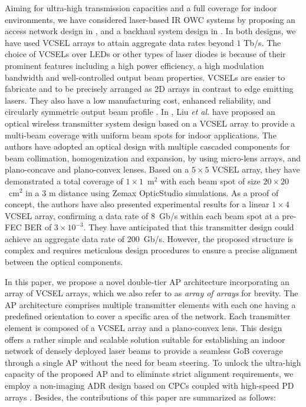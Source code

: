 \documentclass[lettersize,journal]{IEEEtran}
\begin{document}
Aiming for ultra-high transmission capacities and a full coverage for indoor environments, we have considered laser-based \ac{IR} \ac{OWC} systems by proposing an access network design in \cite{ESarbazi2020tb}, and a backhaul system design in \cite{HKazemi2022tb}. In both designs, we have used \ac{VCSEL} arrays to attain aggregate data rates beyond $1$ Tb/s. The choice of \acp{VCSEL} over \acp{LED} or other types of laser diodes is because of their prominent features including a high power efficiency, a high modulation bandwidth and well-controlled output beam properties. \acp{VCSEL} are easier to fabricate and to be precisely arranged as \ac{2D} arrays in contrast to edge emitting lasers. They also have a low manufacturing cost, enhanced reliability, and circularly symmetric output beam profile \cite{RMichalzik2012}. In \cite{YLiu2023}, Liu \textit{et al.} have proposed an optical wireless transmitter system design based on a \ac{VCSEL} array to provide a multi-beam coverage with uniform beam spots for indoor applications. The authors have adopted an optical design with multiple cascaded components for beam collimation, homogenization and expansion, by using micro-lens arrays, and plano-concave and plano-convex lenses. Based on a $5\times5$ \ac{VCSEL} array, they have demonstrated a total coverage of $1\times1$~m$^2$ with each beam spot of size $20\times20$~cm$^2$ in a $3$ m distance using Zemax OpticStudio simulations. As a proof of concept, the authors have also presented experimental results for a linear $1\times4$ \ac{VCSEL} array, confirming a data rate of $8$~Gb/s within each beam spot at a pre-\ac{FEC} \ac{BER} of $3\times10^{-3}$. They have anticipated that this transmitter design could achieve an aggregate data rate of $200$~Gb/s. However, the proposed structure is complex and requires meticulous design procedures to ensure a precise alignment between the optical components.

In this paper, we propose a novel double-tier \ac{AP} architecture incorporating an array of \ac{VCSEL} arrays, which we also refer to as \textit{array of arrays} for brevity. The \ac{AP} architecture comprises multiple transmitter elements with each one having a predefined orientation to cover a specific area of the network. Each transmitter element is composed of a \ac{VCSEL} array and a plano-convex lens. This design offers a rather simple and scalable solution suitable for establishing an indoor network of densely deployed laser beams to provide a seamless \ac{GoB} coverage through a single \ac{AP} without the need for beam steering. To unlock the ultra-high capacity of the proposed \ac{AP} and to eliminate strict alignment requirements, we employ a non-imaging \ac{ADR} design based on \acp{CPC} coupled with high-speed \ac{PD} arrays \cite{ESarbazi2022Design2}. Besides, the contributions of this paper are summarized as follows:
\end{document}
